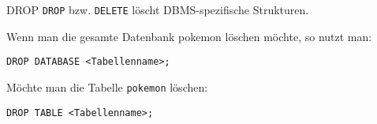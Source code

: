 \begin{sql}{DROP}
    \texttt{DROP} bzw. \texttt{DELETE} löscht DBMS-spezifische Strukturen.

    Wenn man die gesamte Datenbank pokemon löschen möchte, so nutzt man:

    \begin{lstlisting}[language=mysql]
        DROP DATABASE <Tabellenname>;
    \end{lstlisting}

    Möchte man die Tabelle \texttt{pokemon} löschen:

    \begin{lstlisting}[language=mysql]
        DROP TABLE <Tabellenname>;
    \end{lstlisting}
\end{sql}

